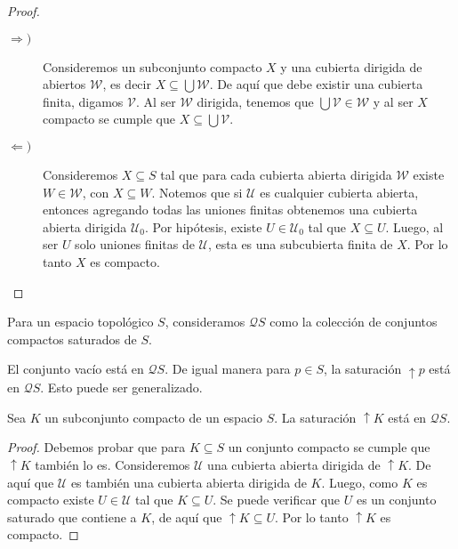 \begin{proof}
\begin{description}
    
    \item[$\Rightarrow )$] Consideremos un subconjunto compacto $X$ y una cubierta dirigida de abiertos $\mathcal{W}$, es decir $X\subseteq\bigcup\mathcal{W}$. De aquí que debe existir una cubierta finita, digamos $\mathcal{V}$. Al ser $\mathcal{W}$ dirigida, tenemos que $\bigcup\mathcal{V}\in \mathcal{W}$ y al ser $X$ compacto se cumple que $X\subseteq \bigcup \mathcal{V}$.
    
    \item[$\Leftarrow )$] Consideremos $X\subseteq S$ tal que para cada cubierta abierta dirigida $\mathcal{W}$ existe $W\in \mathcal{W}$, con $X\subseteq W$. Notemos que si $\mathcal{U}$ es cualquier cubierta abierta, entonces agregando todas las uniones finitas obtenemos una cubierta abierta dirigida $\mathcal{U}_0$. Por hipótesis, existe $U\in\mathcal{U}_0$ tal que $X\subseteq U$. Luego, al ser $U$ solo uniones finitas de $\mathcal{U}$, esta es una subcubierta finita de $X$. Por lo tanto $X$ es compacto.
    \end{description}
    \end{proof}
    
\begin{dfn}\label{Csaturado}
    Para un espacio topológico $S$, consideramos $\mathcal{Q}S$ como la colección de conjuntos compactos saturados de $S$.
\end{dfn}

El conjunto vacío está en $\mathcal{Q}S$. De igual manera para $p\in S$, la saturación $\uparrow{p}$ está en $\mathcal{Q}S$. Esto puede ser generalizado.

\begin{lem}
    Sea $K$ un subconjunto compacto de un espacio $S$. La saturación $\uparrow{K}$ está en $\mathcal{Q}S.$
\end{lem}

\begin{proof}
    Debemos probar que para $K\subseteq S$ un conjunto compacto se cumple que $\uparrow{K}$ también lo es. Consideremos $\mathcal{U}$ una cubierta abierta dirigida de $\uparrow K$. De aquí que $\mathcal{U}$ es también una cubierta abierta dirigida de $K$. Luego, como $K$ es compacto existe $U\in \mathcal{U}$ tal que $K\subseteq U$. Se puede verificar que $U$ es un conjunto saturado que contiene a $K$, de aquí que $\uparrow K\subseteq U$. Por lo tanto $\uparrow K$ es compacto.
\end{proof}

